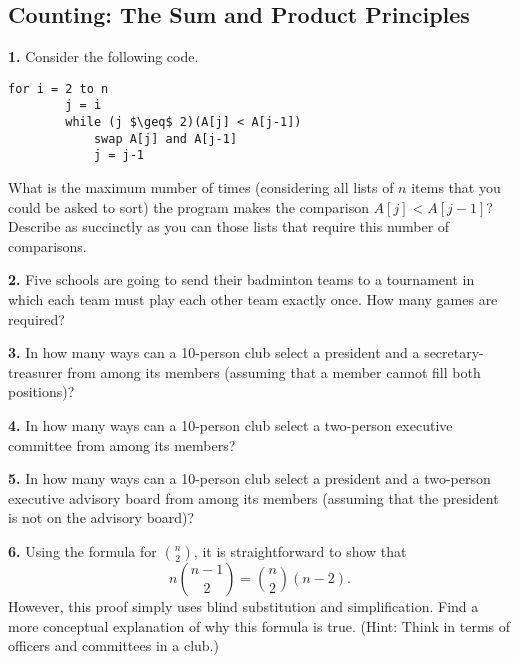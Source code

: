 \documentclass[12pt, letterpaper]{article}
\theoremstyle{definition}
\begin{document}
\subsection*{Counting: The Sum and Product Principles}

\vspace*{0.3in}\noindent
\textbf{1.} Consider the following code.
\begin{center}
    \begin{lstlisting}[label=p1, caption={Problem 1 Code}, mathescape=true]
    for i = 2 to n
        j = i
        while (j $\geq$ 2)(A[j] < A[j-1])
            swap A[j] and A[j-1]
            j = j-1
    \end{lstlisting}
\end{center}
What is the maximum number of times (considering all lists of $n$ items that
you could be asked to sort) the program makes the comparison $A[j] < A[j - 1]$?
Describe as succinctly as you can those lists that require this number of
comparisons.

\vspace*{0.3in}\noindent
\textbf{2.} Five schools are going to send their badminton teams to a tournament
in which each team must play each other team exactly once. How many games are
required?

\vspace*{0.3in}\noindent
\textbf{3.} In how many ways can a 10-person club select a president and a
secretary-treasurer from among its members (assuming that a member cannot fill
both positions)?

\vspace*{0.3in}\noindent
\textbf{4.} In how many ways can a 10-person club select a two-person executive
committee from among its members?

\vspace*{0.3in}\noindent
\textbf{5.} In how many ways can a 10-person club select a president and a
two-person executive advisory board from among its members (assuming that the
president is not on the advisory board)?

\vspace*{0.3in}\noindent
\textbf{6.} Using the formula for $\binom{n}{2}$, it is straightforward to show
that
\begin{equation*}
    n\binom{n-1}{2} = \binom{n}{2}(n-2).
\end{equation*}
However, this proof simply uses blind substitution and simplification.
Find a more conceptual explanation of why this formula is true.
(Hint: Think in terms of officers and committees in a club.)
\end{document}
